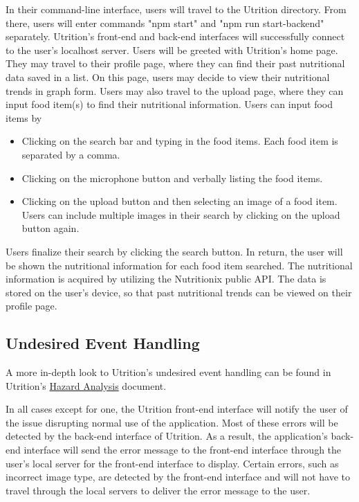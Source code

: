\documentclass[12pt, titlepage]{article}
\begin{document}
In their command-line interface, users will travel to the Utrition directory. From there, users will enter commands "npm start" and "npm run start-backend" separately. Utrition's front-end and back-end interfaces will successfully connect to the user's localhost server. Users will be greeted with Utrition's home page. They may travel to their profile page, where they can find their past nutritional data saved in a list. On this page, users may decide to view their nutritional trends in graph form. Users may also travel to the upload page, where they can input food item(s) to find their nutritional information. Users can input food items by 
\begin{itemize}
	\item Clicking on the search bar and typing in the food items. Each food item is separated by a comma.
	\item Clicking on the microphone button and verbally listing the food items.
	\item Clicking on the upload button and then selecting an image of a food item. Users can include multiple images in their search by clicking on the upload button again.
\end{itemize}
Users finalize their search by clicking the search button. In return, the user will be shown the nutritional information for each food item searched. The nutritional information is acquired by utilizing the Nutritionix public API. The data is stored on the user's device, so that past nutritional trends can be viewed on their profile page.

\subsection{Undesired Event Handling}


A more in-depth look to Utrition's undesired event handling can be found in Utrition's \href{../../HazardAnalysis/HazardAnalysis.pdf}{Hazard Analysis} document.

In all cases except for one, the Utrition front-end interface will notify the user of the issue disrupting normal use of the application. Most of these errors will be detected by the back-end interface of Utrition. As a result, the application's back-end interface will send the error message to the front-end interface through the user's local server for the front-end interface to display. Certain errors, such as incorrect image type, are detected by the front-end interface and will not have to travel through the local servers to deliver the error message to the user. 
\end{document}
